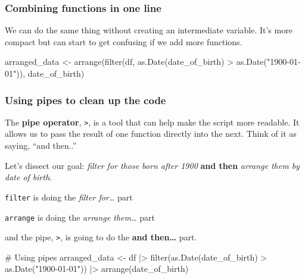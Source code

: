 \documentclass[
  letterpaper,
  DIV=11,
  numbers=noendperiod]{scrreprt}
\newenvironment{Shaded}{\begin{snugshade}}{\end{snugshade}}
\newcommand{\CommentTok}[1]{\textcolor[rgb]{0.37,0.37,0.37}{#1}}
\newcommand{\FunctionTok}[1]{\textcolor[rgb]{0.28,0.35,0.67}{#1}}
\newcommand{\NormalTok}[1]{\textcolor[rgb]{0.00,0.23,0.31}{#1}}
\newcommand{\OtherTok}[1]{\textcolor[rgb]{0.00,0.23,0.31}{#1}}
\newcommand{\SpecialCharTok}[1]{\textcolor[rgb]{0.37,0.37,0.37}{#1}}
\newcommand{\StringTok}[1]{\textcolor[rgb]{0.13,0.47,0.30}{#1}}
\begin{document}
\hypertarget{combining-functions-in-one-line}{%
\subsubsection{Combining functions in one
line}\label{combining-functions-in-one-line}}

We can do the same thing without creating an intermediate variable. It's
more compact but can start to get confusing if we add more functions.

\begin{Shaded}
\begin{Highlighting}[]
\NormalTok{arranged\_data }\OtherTok{\textless{}{-}} \FunctionTok{arrange}\NormalTok{(}\FunctionTok{filter}\NormalTok{(df, }\FunctionTok{as.Date}\NormalTok{(date\_of\_birth) }\SpecialCharTok{\textgreater{}} \FunctionTok{as.Date}\NormalTok{(}\StringTok{"1900{-}01{-}01"}\NormalTok{)), date\_of\_birth)}
\end{Highlighting}
\end{Shaded}

\hypertarget{using-pipes-to-clean-up-the-code}{%
\subsubsection{Using pipes to clean up the
code}\label{using-pipes-to-clean-up-the-code}}

The \textbf{pipe operator}, \texttt{\textbar{}\textgreater{}}, is a tool
that can help make the script more readable. It allows us to pass the
result of one function directly into the next. Think of it as saying,
``and then..''

Let's dissect our goal: \emph{filter for those born after 1900}
\textbf{and then} \emph{arrange them by date of birth}.

\texttt{filter} is doing the \emph{filter for\ldots{}} part

\texttt{arrange} is doing the \emph{arrange them\ldots{}} part

and the pipe, \texttt{\textbar{}\textgreater{}}, is going to do the
\textbf{and then\ldots{}} part.

\begin{Shaded}
\begin{Highlighting}[]
\CommentTok{\# Using pipes}
\NormalTok{arranged\_data }\OtherTok{\textless{}{-}}\NormalTok{ df }\SpecialCharTok{|\textgreater{}}
  \FunctionTok{filter}\NormalTok{(}\FunctionTok{as.Date}\NormalTok{(date\_of\_birth) }\SpecialCharTok{\textgreater{}} \FunctionTok{as.Date}\NormalTok{(}\StringTok{"1900{-}01{-}01"}\NormalTok{)) }\SpecialCharTok{|\textgreater{}}
  \FunctionTok{arrange}\NormalTok{(date\_of\_birth)}
\end{Highlighting}
\end{Shaded}
\end{document}
